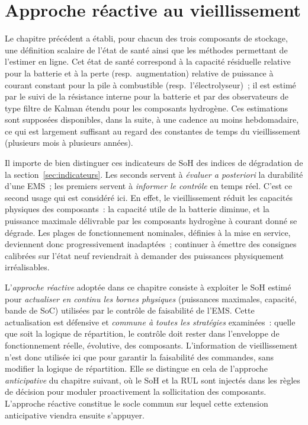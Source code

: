 
\section{Approche réactive au vieillissement}
\label{sec:soh}

Le chapitre précédent a établi, pour chacun des trois composants de stockage, une définition scalaire de l'état de santé ainsi que les méthodes permettant de l'estimer en ligne. Cet état de santé correspond à la capacité résiduelle relative pour la batterie et à la perte (resp.\ augmentation) relative de puissance à courant constant pour la pile à combustible (resp.\ l'électrolyseur)~; il est estimé par le suivi de la résistance interne pour la batterie et par des observateurs de type filtre de Kalman étendu pour les composants hydrogène. Ces estimations sont supposées disponibles, dans la suite, à une cadence au moins hebdomadaire, ce qui est largement suffisant au regard des constantes de temps du vieillissement (plusieurs mois à plusieurs années).

Il importe de bien distinguer ces indicateurs de SoH des indices de dégradation de la section~\ref{sec:indicateurs}. Les seconds servent à \emph{évaluer a posteriori} la durabilité d'une EMS~; les premiers servent à \emph{informer le contrôle} en temps réel. C'est ce second usage qui est considéré ici. En effet, le vieillissement réduit les capacités physiques des composants~: la capacité utile de la batterie diminue, et la puissance maximale délivrable par les composants hydrogène à courant donné se dégrade. Les plages de fonctionnement nominales, définies à la mise en service, deviennent donc progressivement inadaptées~; continuer à émettre des consignes calibrées sur l'état neuf reviendrait à demander des puissances physiquement irréalisables.

L'\emph{approche réactive} adoptée dans ce chapitre consiste à exploiter le SoH estimé pour \emph{actualiser en continu les bornes physiques} (puissances maximales, capacité, bande de SoC) utilisées par le contrôle de faisabilité de l'EMS. Cette actualisation est défensive et \emph{commune à toutes les stratégies} examinées~: quelle que soit la logique de répartition, le contrôle doit rester dans l'enveloppe de fonctionnement réelle, évolutive, des composants. L'information de vieillissement n'est donc utilisée ici que pour garantir la faisabilité des commandes, sans modifier la logique de répartition. Elle se distingue en cela de l'approche \emph{anticipative} du chapitre suivant, où le SoH et la RUL sont injectés dans les règles de décision pour moduler proactivement la sollicitation des composants. L'approche réactive constitue le socle commun sur lequel cette extension anticipative viendra ensuite s'appuyer.
